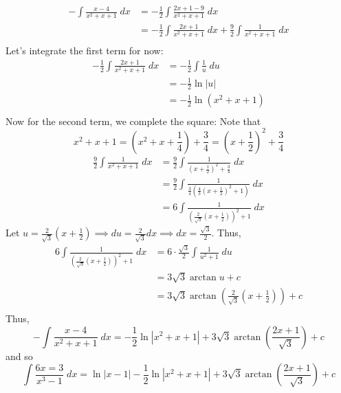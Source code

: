 \documentclass{article}
\begin{document}
\begin{example}
  \begin{align*}
    -\int \frac{x-4}{x^2+x+1} \; dx &= -\frac{1}{2}\int \frac{2x+1-9}{x^2+x+1} \; dx\\
    &= -\frac{1}{2} \int \frac{2x+1}{x^2+x+1} \; dx + \frac{9}{2}\int \frac{1}{x^2+x+1} \; dx\\
  \end{align*}
  Let's integrate the first term for now:
  \begin{align*}
    -\frac{1}{2} \int \frac{2x+1}{x^2+x+1} \; dx&= -\frac{1}{2}\int \frac{1}{u} \; du\\
    &= -\frac{1}{2} \ln |u|\\
    &= -\frac{1}{2} \ln (x^2 + x + 1)\\
  \end{align*}
  Now for the second term, we complete the square:
  Note that \[
    x^2 + x + 1 = \left(x^2 + x + \frac{1}{4}\right) + \frac{3}{4} = \left(x+\frac{1}{2}\right)^2 + \frac{3}{4}
  \]
  \begin{align*}
    \frac{9}{2}\int \frac{1}{x^2+x+1} \; dx &= \frac{9}{2} \int \frac{1}{\left(x+ \frac{1}{2}\right)^2 + \frac{3}{4}} \; dx\\
    &= \frac{9}{2} \int \frac{1}{\frac{3}{4}\left(\frac{4}{3}\left(x + \frac{1}{2}\right)^2 + 1\right)} \; dx\\
    &= 6\int\frac{1}{\left(\frac{2}{\sqrt{3}}\left(x+\frac{1}{2}\right)\right)^2 + 1} \; dx
  \end{align*}
  Let $u = \frac{2}{\sqrt{3}}\left(x + \frac{1}{2}\right) \implies du = \frac{2}{\sqrt{3}} dx \implies dx = \frac{\sqrt{3}}{2}$.
  Thus,
  \begin{align*}
    6\int\frac{1}{\left(\frac{2}{\sqrt{3}}\left(x+\frac{1}{2}\right)\right)^2 + 1} \; dx &= 6\cdot\frac{\sqrt{3}}{2}\int \frac{1}{u^2 + 1} \; du\\
    &= 3\sqrt{3} \arctan u + c\\
    &= 3\sqrt{3} \arctan \left(\frac{2}{\sqrt{3}}\left(x+\frac{1}{2}\right)\right) + c\\
  \end{align*}
  Thus, \[
    -\int \frac{x -4}{x^2+x+1} \; dx = -\frac{1}{2} \ln |x^2+x+1| + 3\sqrt{3} \arctan\left(\frac{2x+1}{\sqrt{3}}\right) + c
  \] and so \[
    \int \frac{6x=3}{x^3 -1} \; dx= \ln |x-1| -\frac{1}{2} \ln |x^2+x+1| + 3\sqrt{3} \arctan\left(\frac{2x+1}{\sqrt{3}}\right) + c
  \]
\end{example}
\end{document}

